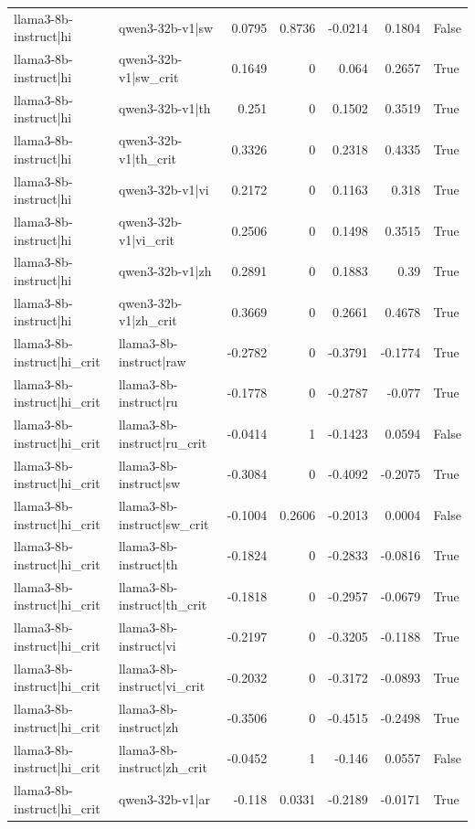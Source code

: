 \begin{table}
\begin{tabular}{l l r r r r l}
llama3-8b-instruct|hi & qwen3-32b-v1|sw & 0.0795 & 0.8736 & -0.0214 & 0.1804 & False \\
llama3-8b-instruct|hi & qwen3-32b-v1|sw_crit & 0.1649 & 0 & 0.064 & 0.2657 & True \\
llama3-8b-instruct|hi & qwen3-32b-v1|th & 0.251 & 0 & 0.1502 & 0.3519 & True \\
llama3-8b-instruct|hi & qwen3-32b-v1|th_crit & 0.3326 & 0 & 0.2318 & 0.4335 & True \\
llama3-8b-instruct|hi & qwen3-32b-v1|vi & 0.2172 & 0 & 0.1163 & 0.318 & True \\
llama3-8b-instruct|hi & qwen3-32b-v1|vi_crit & 0.2506 & 0 & 0.1498 & 0.3515 & True \\
llama3-8b-instruct|hi & qwen3-32b-v1|zh & 0.2891 & 0 & 0.1883 & 0.39 & True \\
llama3-8b-instruct|hi & qwen3-32b-v1|zh_crit & 0.3669 & 0 & 0.2661 & 0.4678 & True \\
llama3-8b-instruct|hi_crit & llama3-8b-instruct|raw & -0.2782 & 0 & -0.3791 & -0.1774 & True \\
llama3-8b-instruct|hi_crit & llama3-8b-instruct|ru & -0.1778 & 0 & -0.2787 & -0.077 & True \\
llama3-8b-instruct|hi_crit & llama3-8b-instruct|ru_crit & -0.0414 & 1 & -0.1423 & 0.0594 & False \\
llama3-8b-instruct|hi_crit & llama3-8b-instruct|sw & -0.3084 & 0 & -0.4092 & -0.2075 & True \\
llama3-8b-instruct|hi_crit & llama3-8b-instruct|sw_crit & -0.1004 & 0.2606 & -0.2013 & 0.0004 & False \\
llama3-8b-instruct|hi_crit & llama3-8b-instruct|th & -0.1824 & 0 & -0.2833 & -0.0816 & True \\
llama3-8b-instruct|hi_crit & llama3-8b-instruct|th_crit & -0.1818 & 0 & -0.2957 & -0.0679 & True \\
llama3-8b-instruct|hi_crit & llama3-8b-instruct|vi & -0.2197 & 0 & -0.3205 & -0.1188 & True \\
llama3-8b-instruct|hi_crit & llama3-8b-instruct|vi_crit & -0.2032 & 0 & -0.3172 & -0.0893 & True \\
llama3-8b-instruct|hi_crit & llama3-8b-instruct|zh & -0.3506 & 0 & -0.4515 & -0.2498 & True \\
llama3-8b-instruct|hi_crit & llama3-8b-instruct|zh_crit & -0.0452 & 1 & -0.146 & 0.0557 & False \\
llama3-8b-instruct|hi_crit & qwen3-32b-v1|ar & -0.118 & 0.0331 & -0.2189 & -0.0171 & True \\

\end{tabular}
\end{table}

